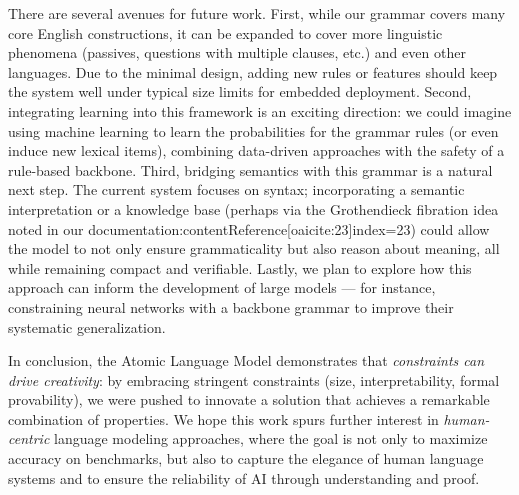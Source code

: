 \documentclass[11pt]{article}
\begin{document}
There are several avenues for future work. First, while our grammar covers many core English constructions, it can be expanded to cover more linguistic phenomena (passives, questions with multiple clauses, etc.) and even other languages. Due to the minimal design, adding new rules or features should keep the system well under typical size limits for embedded deployment. Second, integrating learning into this framework is an exciting direction: we could imagine using machine learning to learn the probabilities for the grammar rules (or even induce new lexical items), combining data-driven approaches with the safety of a rule-based backbone. Third, bridging semantics with this grammar is a natural next step. The current system focuses on syntax; incorporating a semantic interpretation or a knowledge base (perhaps via the Grothendieck fibration idea noted in our documentation:contentReference[oaicite:23]{index=23}) could allow the model to not only ensure grammaticality but also reason about meaning, all while remaining compact and verifiable. Lastly, we plan to explore how this approach can inform the development of large models — for instance, constraining neural networks with a backbone grammar to improve their systematic generalization.

In conclusion, the Atomic Language Model demonstrates that \emph{constraints can drive creativity}: by embracing stringent constraints (size, interpretability, formal provability), we were pushed to innovate a solution that achieves a remarkable combination of properties. We hope this work spurs further interest in \emph{human-centric} language modeling approaches, where the goal is not only to maximize accuracy on benchmarks, but also to capture the elegance of human language systems and to ensure the reliability of AI through understanding and proof. 
\end{document}
